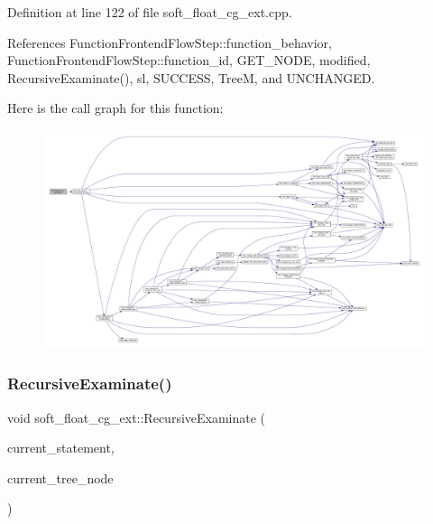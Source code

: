 Definition at line 122 of file soft\+\_\+float\+\_\+cg\+\_\+ext.\+cpp.



References Function\+Frontend\+Flow\+Step\+::function\+\_\+behavior, Function\+Frontend\+Flow\+Step\+::function\+\_\+id, G\+E\+T\+\_\+\+N\+O\+DE, modified, Recursive\+Examinate(), sl, S\+U\+C\+C\+E\+SS, TreeM, and U\+N\+C\+H\+A\+N\+G\+ED.

Here is the call graph for this function\+:
\nopagebreak
\begin{figure}[H]
\begin{center}
\leavevmode
\includegraphics[width=350pt]{d2/db0/classsoft__float__cg__ext_a74ee320b5843e7266c0111511b6aeedc_cgraph}
\end{center}
\end{figure}
\mbox{\label{classsoft__float__cg__ext_a3046064995739c8e40511505679140ae}} 
\subsubsection{\texorpdfstring{Recursive\+Examinate()}{RecursiveExaminate()}}
{\footnotesize\ttfamily void soft\+\_\+float\+\_\+cg\+\_\+ext\+::\+Recursive\+Examinate (\begin{DoxyParamCaption}\item[{const \hyperlink{tree__node_8hpp_a6ee377554d1c4871ad66a337eaa67fd5}{tree\+\_\+node\+Ref}}]{current\+\_\+statement,  }\item[{const \hyperlink{tree__node_8hpp_a6ee377554d1c4871ad66a337eaa67fd5}{tree\+\_\+node\+Ref}}]{current\+\_\+tree\+\_\+node }\end{DoxyParamCaption})\hspace{0.3cm}{\ttfamily [protected]}}



